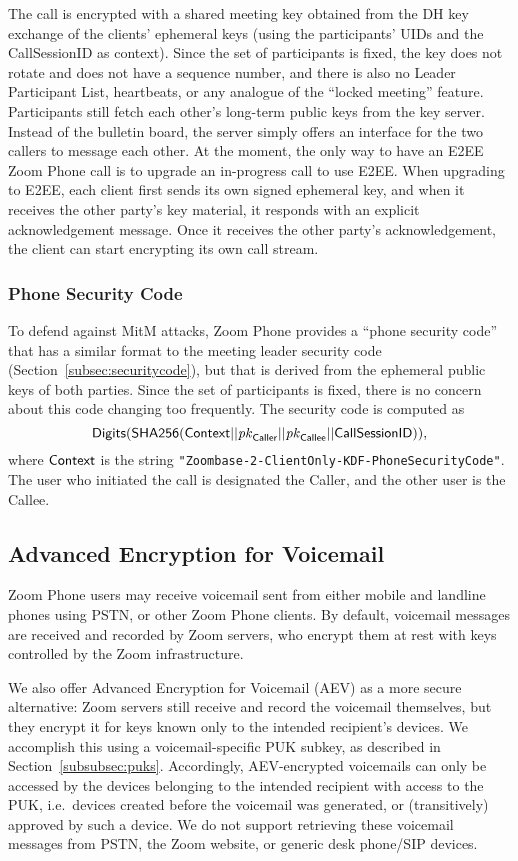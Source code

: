 The call is encrypted with a shared meeting key obtained from the DH key exchange of the clients'
ephemeral keys (using the participants' UIDs and the {\sf CallSessionID} as context). Since the set
of participants is fixed, the key does not rotate and does not have a sequence number, and there is
also no Leader Participant List, heartbeats, or any analogue of the ``locked meeting'' feature.
Participants still fetch each other's long-term public keys from the key server. Instead of the
bulletin board, the server simply offers an interface for the two callers to message each other. At
the moment, the only way to have an E2EE Zoom Phone call is to upgrade an in-progress call to use
E2EE. When upgrading to E2EE, each client first sends its own signed ephemeral key, and when it
receives the other party's key material, it responds with an explicit acknowledgement message. Once
it receives the other party's acknowledgement, the client can start encrypting its own call stream.

\subsubsection{Phone Security Code}

To defend against MitM attacks, Zoom Phone provides a ``phone security code'' that has a similar
format to the meeting leader security code (Section~\ref{subsec:securitycode}), but that is derived
from the ephemeral public keys of both parties. Since the set of participants is fixed, there is no
concern about this code changing too frequently. The security code is computed as
$$\mathsf{Digits}({\sf SHA256}({\sf Context} || \mathit{pk}_{\sf Caller} || \mathit{pk}_{\sf Callee} || {\sf
CallSessionID})),$$ %
where ${\sf Context}$ is the string \texttt{"Zoombase-2-ClientOnly-KDF-PhoneSecurityCode"}. The user who
initiated the call is designated the {\sf Caller}, and the other user is the {\sf Callee}.

\subsection{Advanced Encryption for Voicemail}\label{subsec:voicemail} Zoom Phone users may receive
voicemail sent from either mobile and landline phones using PSTN, or other Zoom Phone clients. By
default, voicemail messages are received and recorded by Zoom servers, who encrypt them at rest with
keys controlled by the Zoom infrastructure. 

We also offer Advanced Encryption for Voicemail (AEV) as a more secure alternative: Zoom servers
still receive and record the voicemail themselves, but they encrypt it for keys known only to the
intended recipient's devices. We accomplish this using a voicemail-specific PUK subkey, as described
in Section~\ref{subsubsec:puks}. Accordingly, AEV-encrypted voicemails can only be accessed by the
devices belonging to the intended recipient with access to the PUK, i.e.\ devices created before the
voicemail was generated, or (transitively) approved by such a device. We do not support retrieving
these voicemail messages from PSTN, the Zoom website, or generic desk phone/SIP devices. 

